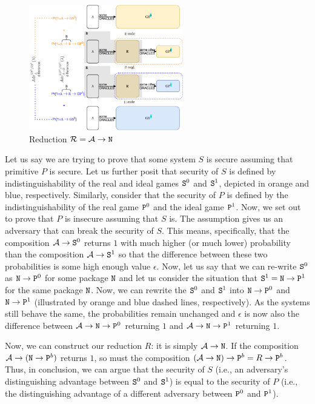 \begin{figure}
\vspace{-0.5cm}
\begin{center}
\includegraphics[width=0.6\textwidth]{figs/reduction}
\caption{\label{fig:reduction-example}Reduction $\mathcal{R}=\mathcal{A}\rightarrow\text{\texttt{N}}$}
\end{center}
\vspace{-0.5cm}
\end{figure}

Let us say we are trying to prove that some system $S$ is secure assuming that primitive $P$ is secure. Let us further posit that security of  $S$ is defined by indistinguishability of the real and ideal games $\text{\texttt{S}}^0$ and $\text{\texttt{S}}^1$, depicted in orange and blue, respectively. Similarly, consider that the security of $P$ is defined by the indistinguishability of the real game $\text{\texttt{P}}^0$ and the ideal game $\text{\texttt{P}}^1$. Now, we set out to prove that $P$ is insecure assuming that $S$ is. The assumption gives us an adversary that can break the security of $S$. This means, specifically, that the composition $\mathcal{A}\rightarrow\text{\texttt{S}}^0$ returns $1$ with much higher (or much lower) probability than the composition
$\mathcal{A}\rightarrow\text{\texttt{S}}^1$ so that the difference between these two probabilities is some high enough value $\epsilon$. Now, let us say that we can re-write $\text{\texttt{S}}^0$ as $\text{\texttt{N}}\rightarrow\text{\texttt{P}}^0$ for some package $\text{\texttt{N}}$ and let us consider the situation that $\text{\texttt{S}}^1=\text{\texttt{N}}\rightarrow\text{\texttt{P}}^1$ for the same package $\text{\texttt{N}}$. Now, we can rewrite the $\text{\texttt{S}}^0$ and $\text{\texttt{S}}^1$ into $\text{\texttt{N}}\rightarrow\text{\texttt{P}}^0$ and $\text{\texttt{N}}\rightarrow\text{\texttt{P}}^1$ (illustrated by orange and blue dashed lines, respectively). As the systems still behave the same, the probabilities remain unchanged and $\epsilon$ is now also the difference between $\mathcal{A} \rightarrow \text{\texttt{N}} \rightarrow \text{\texttt{P}}^0$ returning $1$ and $\mathcal{A} \rightarrow \text{\texttt{N}} \rightarrow \text{\texttt{P}}^1$ returning $1$.

Now, we can construct our reduction $R$: it is simply $\mathcal{A} \rightarrow \text{\texttt{N}}$. If the composition $\mathcal{A} \rightarrow (\text{\texttt{N}} \rightarrow \text{\texttt{P}}^b)$ returns $1$, so must the composition $(\mathcal{A} \rightarrow \text{\texttt{N}}) \rightarrow \text{\texttt{P}}^b = R \rightarrow \text{\texttt{P}}^b$. Thus, in conclusion, we can argue that the security of $S$ (i.e., an adversary's distinguishing advantage between $\text{\texttt{S}}^0$ and $\text{\texttt{S}}^1$) is equal to the security of $P$ (i.e., the distinguishing advantage of a different adversary between $\text{\texttt{P}}^0$ and $\text{\texttt{P}}^1$). 

